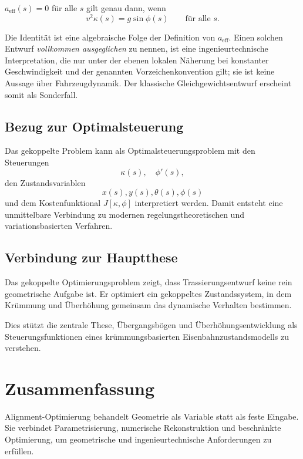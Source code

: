 \begin{corollary}[Ausgleichsidentität]
\label{cor:balance-identity}
\(a_{\mathrm{eff}}(s)=0\) für alle \(s\) gilt genau dann, wenn
\[
v^2\kappa(s)=g\sin\phi(s)
\qquad\text{für alle } s .
\]
\end{corollary}

Die Identität ist eine algebraische Folge der Definition von
\(a_{\mathrm{eff}}\). Einen solchen Entwurf \emph{vollkommen ausgeglichen}
zu nennen, ist eine ingenieurtechnische Interpretation, die nur unter der
ebenen lokalen Näherung bei konstanter Geschwindigkeit und der genannten
Vorzeichenkonvention gilt; sie ist keine Aussage über Fahrzeugdynamik.
Der klassische Gleichgewichtsentwurf erscheint somit als Sonderfall.

\subsection{Bezug zur Optimalsteuerung}
Das gekoppelte Problem kann als Optimalsteuerungsproblem mit den Steuerungen
\[
\kappa(s),\quad\phi'(s),
\]
den Zustandsvariablen
\[
x(s),y(s),\theta(s),\phi(s)
\]
und dem Kostenfunktional \(J[\kappa,\phi]\) interpretiert werden. Damit entsteht
eine unmittelbare Verbindung zu modernen regelungstheoretischen und
variationsbasierten Verfahren.

\subsection{Verbindung zur Hauptthese}
\begin{summary}
Das gekoppelte Optimierungsproblem zeigt, dass Trassierungsentwurf keine rein
geometrische Aufgabe ist. Er optimiert ein gekoppeltes Zustandssystem, in dem
Krümmung und Überhöhung gemeinsam das dynamische Verhalten bestimmen.

Dies stützt die zentrale These, Übergangsbögen und Überhöhungsentwicklung als
Steuerungsfunktionen eines krümmungsbasierten Eisenbahnzustandsmodells zu
verstehen.
\end{summary}

\section{Zusammenfassung}
\begin{summary}
Alignment-Optimierung behandelt Geometrie als Variable statt als feste
Eingabe. Sie verbindet Parametrisierung, numerische Rekonstruktion und
beschränkte Optimierung, um geometrische und ingenieurtechnische Anforderungen
zu erfüllen.
\end{summary}
